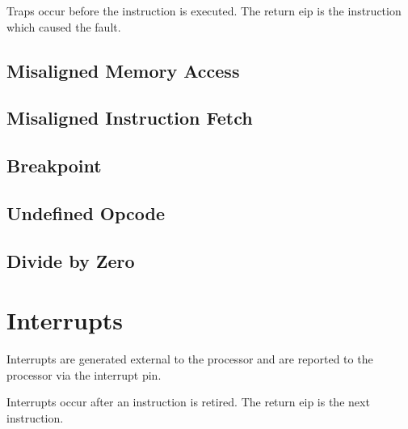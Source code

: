 Traps occur before the instruction is executed.  The return eip is the
instruction which caused the fault.

\subsection{Misaligned Memory Access}
\subsection{Misaligned Instruction Fetch}
\subsection{Breakpoint}
\subsection{Undefined Opcode}
\subsection{Divide by Zero}

\section{Interrupts}

Interrupts are generated external to the \skl processor and are
reported to the \skl processor via the interrupt pin.

Interrupts occur after an instruction is retired.  The return eip is
the next instruction.

